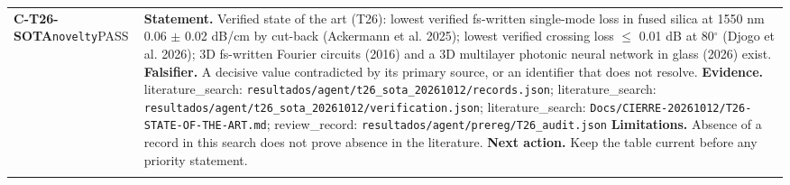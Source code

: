 \begin{longtable}{@{}>{\raggedright\arraybackslash}p{2.35cm}>{\raggedright\arraybackslash}p{13.2cm}@{}}
\textbf{C-T26-SOTA}\newline \texttt{novelty}\newline PASS & \textbf{Statement.} Verified state of the art (T26): lowest verified fs-written single-mode loss in fused silica at 1550 nm 0.06 $\pm$ 0.02 dB/\allowbreak{}cm by cut-back (Ackermann et al. 2025); lowest verified crossing loss $\le$ 0.01 dB at 80$^\circ$ (Djogo et al. 2026); 3D fs-written Fourier circuits (2016) and a 3D multilayer photonic neural network in glass (2026) exist. \newline \textbf{Falsifier.} A decisive value contradicted by its primary source, or an identifier that does not resolve. \newline \textbf{Evidence.} literature\_\allowbreak{}search: \texttt{resultados/\allowbreak{}agent/\allowbreak{}t26\_\allowbreak{}sota\_\allowbreak{}20261012/\allowbreak{}records.json}; literature\_\allowbreak{}search: \texttt{resultados/\allowbreak{}agent/\allowbreak{}t26\_\allowbreak{}sota\_\allowbreak{}20261012/\allowbreak{}verification.json}; literature\_\allowbreak{}search: \texttt{Docs/\allowbreak{}CIERRE-20261012/\allowbreak{}T26-STATE-OF-THE-ART.md}; review\_\allowbreak{}record: \texttt{resultados/\allowbreak{}agent/\allowbreak{}prereg/\allowbreak{}T26\_\allowbreak{}audit.json} \newline \textbf{Limitations.} Absence of a record in this search does not prove absence in the literature. \newline \textbf{Next action.} Keep the table current before any priority statement. \\ \addlinespace[2pt]

\end{longtable}
